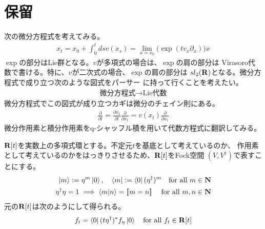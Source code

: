 {\section{保留}\label{s1:保留} %
	次の微分方程式を考えてみる。
	\begin{equation*}\begin{split}
		x_t = x_0 + \int_0^t dsv(x_s) 
		= \lim_{x=x_0}\bigl(\exp(tv_x\partial_x)\bigl)x
	\end{split}\end{equation*}
	$\exp$の部分はLie群となる。$v$が多項式の場合は、$\exp$の肩の部分は
	Virasoro代数で書ける。特に、$v$が二次式の場合、$\exp$の肩の部分は
	$sl_2(\mathbf{R})$となる。微分方程式で成り立つ次のような図式をパーサー
	に持って行くことを考えたい。
	\begin{equation*}\begin{split}
		\text{微分方程式} \to \text{Lie代数}
	\end{split}\end{equation*}
	微分方程式でこの図式が成り立つカギは微分のチェイン則にある。
	\begin{equation*}\begin{split}
		\frac{\partial}{\partial t}
		= \frac{\partial x_t}{\partial t}\frac{\partial}{\partial x_t}
		= v(x_t)\frac{\partial}{\partial x_t}
	\end{split}\end{equation*}
	微分作用素と積分作用素をq-シャッフル積を用いて代数方程式に翻訳してみる。

	$\mathbf{R}[t]$を実数上の多項式環とする。不定元$t$を基底として考えているのか、
	作用素として考えているのかをはっきりさせるため、$\mathbf{R}[t]$をFock空間
	$(V,V^\dag)$で表すことにする。
	\begin{equation*}\begin{split}
		\mathinner{|{m}\rangle} := \eta^m\mathinner{|{0}\rangle},\quad
		\mathinner{\langle{m}|} := \mathinner{\langle{0}|}(\eta^\dag)^m \quad\text{for all } m\in\mathbf{N} \\
		\eta^\dag\eta = 1
		\implies \mathinner{\langle{m|n}\rangle} = [\![m = n]\!]\; \quad\text{for all } m,n\in\mathbf{N}
	\end{split}\end{equation*}
	元の$\mathbf{R}[t]$は次のようにして得られる。
	\begin{equation*}\begin{split}
		f_t = \mathinner{\langle{0}|}(t\eta^\dag)^*f_\eta\mathinner{|{0}\rangle}
		\quad\text{for all } f_t\in\mathbf{R}[t]
	\end{split}\end{equation*}

}
